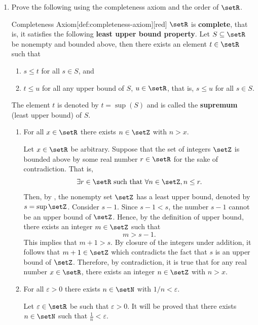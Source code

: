 \begin{enumerate}
  \item Prove the following using the completeness axiom and the order of \(\setR\).
  \begin{define}{Completeness Axiom}[def:completeness-axiom][red]
    $\setR$ is \textbf{complete}, that is, it satisfies the following \textbf{least upper bound property}.\proofstep
    Let $S\subseteq\setR$ be nonempty and bounded above, 
    then there exists an element $t\in\setR$ such that
    \begin{enumerate}
      \item $s\le t$ for all $s \in S$, and
      \item $t\le u$ for all any upper bound of $S$, $u\in\setR$, that is, $s\le u$ for all $s \in S$.
    \end{enumerate}
    The element $t$ is denoted by $t=\sup(S)$ and is called the \textbf{supremum} (least upper bound) of $S$.
  \end{define}    
    \begin{enumerate}[label=(\alph*)]
      \item For all \(x\in\setR\) there exists \(n\in\setZ\) with \(n>x\).
      \begin{subprove}
        Let \(x \in \setR\) be arbitrary. Suppose that 
        the set of integers \(\setZ\) is bounded above by some real number \(r \in \setR\)
        for the sake of contradiction. That is, 
        \[
          \exists r \in \setR \text{ such that } \forall n \in \setZ, n \le r.
        \]
        Then, by , the nonempty set \(\setZ\) has 
        a least upper bound, denoted by \(s = \sup \setZ\).
        Consider \(s - 1\). Since \(s - 1 < s\), the number \(s - 1\) cannot 
        be an upper bound of \(\setZ\).
        Hence, by the definition of upper bound, 
        there exists an integer \(m \in \setZ\) such that
        \[
          m > s - 1.
        \]
        This implies that \(m + 1 > s\). By closure of the integers under addition, 
        it follows that \(m + 1 \in \setZ\) 
        which contradicts the fact that \(s\) is an upper bound of \(\setZ\).
        Therefore, by contradiction, it is true that 
        for any real number \(x \in \setR\), there exists an integer \(n \in \setZ\) with \(n > x\).
      \end{subprove}
      \item For all \(\varepsilon>0\) there exists \(n\in\setN\) with \(1/n<\varepsilon\).
      \begin{subprove}
        Let \(\varepsilon \in \setR\) be such that \(\varepsilon > 0\).
        It will be proved that there exists \(n \in \setN\) such that \(\frac{1}{n} < \varepsilon\).
        

\end{subprove}
\end{enumerate}
\end{enumerate}
